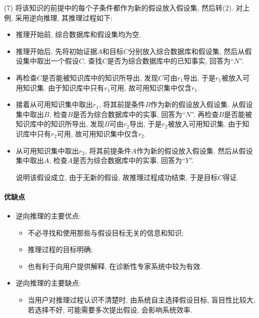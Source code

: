 (7) 将该知识的前提中的每个子条件都作为新的假设放入假设集, 然后转(2).
对上例, 采用逆向推理, 其推理过程如下:
\begin{itemize}
\item 推理开始前, 综合数据库和假设集均为空.
\item 推理开始后, 先将初始证据$A$和目标$C$分别放入综合数据库和假设集, 然后从假设集中取出一个假设$C$, 查找$C$是否为综合数据库中的已知事实, 回答为“$N$”.
\item 再检查$C$是否能被知识库中的知识所导出, 发现$C$可由$r_1$导出, 于是$r_1$被放入可用知识集. 由于知识库中只有$r_1$可用, 故可用知识集中仅含$r_1$.
\item 接着从可用知识集中取出$r_1$, 将其前提条件$B$作为新的假设放入假设集. 从假设集中取出$B$, 检查$B$是否为综合数据库中的实事, 回答为“$N$”. 再检查$B$是否能被知识库中的知识所导出, 发现$B$可由$r_2$导出, 于是$r_2$被放入可用知识集. 由于知识库中只有$r_2$可用, 故可用知识集中仅含$r_2$.
\item 从可用知识集中取出$r_2$, 将其前提条件$A$作为新的假设放入假设集. 然后从假设集中取出$A$, 检查$A$是否为综合数据库中的实事, 回答为“$Y$”.

    说明该假设成立, 由于无新的假设, 故推理过程成功结束, 于是目标$C$得证.
\end{itemize}
\paragraph{优缺点}
\begin{itemize}
\item 逆向推理的主要优点:
\begin{itemize}
\item 不必寻找和使用那些与假设目标无关的信息和知识;
\item 推理过程的目标明确;
\item 也有利于向用户提供解释, 在诊断性专家系统中较为有效.
\end{itemize}
\end{itemize}

\begin{itemize}
\item 逆向推理的主要缺点:
\begin{itemize}
\item 当用户对推理过程认识不清楚时, 由系统自主选择假设目标, 盲目性比较大, 若选择不好, 可能需要多次提出假设, 会影响系统效率.
\end{itemize}
\end{itemize}
